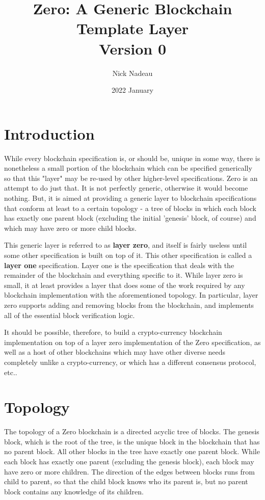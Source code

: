 \documentclass[12pt]{article}
\title{Zero: A Generic Blockchain Template Layer \\
	\large Version 0}
\author{Nick Nadeau}
\date{2022 January}
\begin{document}
\maketitle

\section{Introduction}
While every blockchain specification is, or should be, unique in some way, there is nonetheless a small portion of the blockchain which can be specified generically so that this "layer" may be re-used by other higher-level specifications. Zero is an attempt to do just that. It is not perfectly generic, otherwise it would become nothing. But, it is aimed at providing a generic layer to blockchain specifications that conform at least to a certain topology - a tree of blocks in which each block has exactly one parent block (excluding the initial 'genesis' block, of course) and which may have zero or more child blocks.

This generic layer is referred to as \textbf{layer zero}, and itself is fairly useless until some other specification is built on top of it. This other specification is called a \textbf{layer one} specification. Layer one is the specification that deals with the remainder of the blockchain and everything specific to it. While layer zero is small, it at least provides a layer that does some of the work required by any blockchain implementation with the aforementioned topology. In particular, layer zero supports adding and removing blocks from the blockchain, and implements all of the essential block verification logic.

It should be possible, therefore, to build a crypto-currency blockchain implementation on top of a layer zero implementation of the Zero specification, as well as a host of other blockchains which may have other diverse needs completely unlike a crypto-currency, or which has a different consensus protocol, etc..

\section{Topology}
The topology of a Zero blockchain is a directed acyclic tree of blocks. The genesis block, which is the root of the tree, is the unique block in the blockchain that has no parent block. All other blocks in the tree have exactly one parent block. While each block has exactly one parent (excluding the genesis block), each block may have zero or more children. The direction of the edges between blocks runs from child to parent, so that the child block knows who its parent is, but no parent block contains any knowledge of its children.
\end{document}
